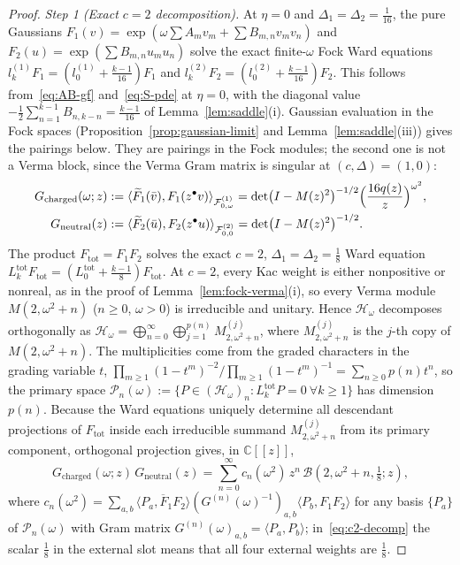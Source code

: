 \documentclass[twoside,10pt]{article}
\numberwithin{equation}{section}
\theoremstyle{slbody}
\theoremstyle{definition}
\theoremstyle{remark}
\begin{document}
\begin{proof}
\emph{Step 1 (Exact \(c=2\) decomposition).}  At \(\eta=0\) and
\(\Delta_1=\Delta_2=\frac1{16}\), the pure Gaussians
\(F_1(v)=\exp(\omega\sum A_mv_m+\sum B_{m,n}v_mv_n)\) and
\(F_2(u)=\exp(\sum B_{m,n}u_mu_n)\) solve the exact finite-\(\omega\) Fock
Ward equations \(l_k^{(1)}F_1=(l_0^{(1)}+\frac{k-1}{16})F_1\) and
\(l_k^{(2)}F_2=(l_0^{(2)}+\frac{k-1}{16})F_2\).  This follows
from~\eqref{eq:AB-gf} and~\eqref{eq:S-pde} at \(\eta=0\), with the diagonal
value \(-\frac12\sum_{n=1}^{k-1}B_{n,k-n}=\frac{k-1}{16}\) of
Lemma~\ref{lem:saddle}(i).  Gaussian evaluation in the Fock spaces
(Proposition~\ref{prop:gaussian-limit} and Lemma~\ref{lem:saddle}(iii)) gives the
pairings below.  They are pairings in the Fock modules; the second one is
not a Verma block, since the Verma Gram matrix is singular at
\((c,\Delta)=(1,0)\):
\begin{align*}
 G_{\mathrm{charged}}(\omega;z)
 &:=\langle\widetilde F_1(\bar v),F_1(z^\bullet v)\rangle_{\mathcal F^{(1)}_{0,\omega}}
  =\det\bigl(I-M(z)^2\bigr)^{-1/2}\Bigl(\frac{16q(z)}{z}\Bigr)^{\omega^2},\\
 G_{\mathrm{neutral}}(z)
 &:=\langle\widetilde F_2(\bar u),F_2(z^\bullet u)\rangle_{\mathcal F^{(2)}_{0,0}}
  =\det\bigl(I-M(z)^2\bigr)^{-1/2}.
\end{align*}
The product \(F_{\mathrm{tot}}=F_1F_2\) solves the
exact \(c=2\), \(\Delta_1=\Delta_2=\frac18\) Ward equation
\(L_k^{\mathrm{tot}}F_{\mathrm{tot}}=(L_0^{\mathrm{tot}}+\frac{k-1}{8})F_{\mathrm{tot}}\).
At \(c=2\), every Kac weight is either nonpositive or nonreal, as in the
proof of Lemma~\ref{lem:fock-verma}(i), so every Verma module
\(M(2,\omega^2+n)\) (\(n\geq0\), \(\omega>0\)) is irreducible and unitary.
Hence \(\mathcal H_\omega\) decomposes orthogonally as
\(\mathcal H_\omega=\bigoplus_{n=0}^\infty\bigoplus_{j=1}^{p(n)}M_{2,\omega^2+n}^{(j)}\),
where \(M^{(j)}_{2,\omega^2+n}\) is the \(j\)-th copy of \(M(2,\omega^2+n)\).  The
multiplicities come from the graded characters in the grading variable \(t\),
\(\prod_{m\geq1}(1-t^m)^{-2}/\prod_{m\geq1}(1-t^m)^{-1}=\sum_{n\geq0}p(n)t^n\),
so the primary space
\(\mathcal P_n(\omega):=\{P\in(\mathcal H_\omega)_n:L_k^{\mathrm{tot}}P=0\ \forall k\geq1\}\)
has dimension \(p(n)\).  Because the Ward equations uniquely determine all
descendant projections of \(F_{\mathrm{tot}}\) inside each irreducible summand
\(M_{2,\omega^2+n}^{(j)}\) from its primary component, orthogonal projection
gives, in \(\mathbb C[[z]]\),
\begin{equation}\label{eq:c2-decomp}
 G_{\mathrm{charged}}(\omega;z)\,G_{\mathrm{neutral}}(z)
 =\sum_{n=0}^\infty c_n(\omega^2)\,z^n\,\mathcal B(2,\omega^2+n,\tfrac18;z),
\end{equation}
where
\(c_n(\omega^2)=\sum_{a,b}\overline{\langle P_a,F_1F_2\rangle}(G^{(n)}(\omega)^{-1})_{a,b}\langle P_b,F_1F_2\rangle\)
for any basis \(\{P_a\}\) of \(\mathcal P_n(\omega)\) with Gram matrix
\(G^{(n)}(\omega)_{a,b}=\langle P_a,P_b\rangle\); in~\eqref{eq:c2-decomp} the scalar
\(\tfrac18\) in the external slot means that all four external weights are
\(\tfrac18\).


\end{proof}
\end{document}
